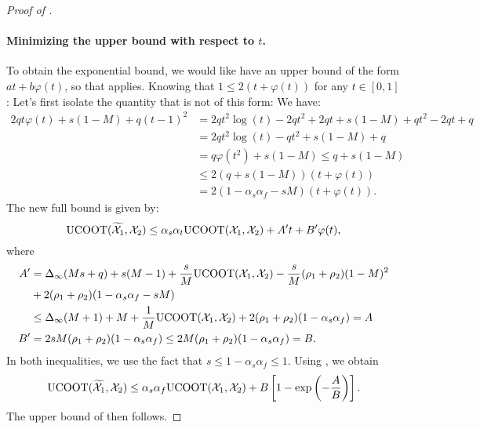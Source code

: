 \begin{proof}[Proof of ]
  \paragraph{Minimizing the upper bound with respect to $t$.}
  To obtain the exponential bound, we would like have an upper bound of the form
  $at + b\varphi(t)$, so that  applies.
  Knowing that $1 \leq 2(t + \varphi(t))$ for any $t \in [0, 1]$:
  Let's first isolate the quantity that is not of this form:
  We have:
  \begin{equation}
    \begin{split}
      2q t \varphi(t) + s(1 - M) + q(t-1)^2 &= 2qt^2\log(t) - 2qt^2 + 2qt + s(1-M) + qt^2 -2qt + q \\
      &=  2qt^2\log(t) - qt^2 + s(1-M) + q \\
      &= q\varphi(t^2) + s(1-M) \leq q + s(1-M) \\
      &\leq 2(q + s(1-M)) (t + \varphi(t)) \\
      &= 2(1 -\alpha_s\alpha_f - sM) (t + \varphi(t)).
    \end{split}
  \end{equation}
  The new full bound is given by:
  \begin{equation}
      \text{UCOOT}(\widetilde{\mathcal X_1}, \mathcal X_2) \leq \alpha_s\alpha_t \text{UCOOT}(\mathcal X_1, \mathcal X_2) + A' t + B'\varphi(t),
  \end{equation}
  where
  \begin{equation}
      \begin{split}
          A' &= \Delta_{\infty}(Ms + q) + s(M-1) + \frac{s}{M}\text{UCOOT}(\mathcal X_1, \mathcal X_2) - \frac{s}{M}(\rho_1 + \rho_2)(1-M)^2 \\
          &+ 2(\rho_1 + \rho_2) (1-\alpha_s\alpha_f - sM) \\
          & \leq \Delta_{\infty}(M + 1) + M + \frac{1}{M}\text{UCOOT}(\mathcal X_1, \mathcal X_2) + 2(\rho_1 + \rho_2) (1-\alpha_s\alpha_f) = A \\
          B' &= 2sM(\rho_1 + \rho_2) (1-\alpha_s\alpha_f) \leq 2M(\rho_1 + \rho_2) (1-\alpha_s\alpha_f) = B.
      \end{split}
  \end{equation}
  In both inequalities, we use the fact that $s \leq 1 - \alpha_s \alpha_f \leq 1$.
  Using , we obtain
  \begin{equation}
      \text{UCOOT}(\widetilde{\mathcal X_1}, \mathcal X_2)
      \leq \alpha_s\alpha_f \text{UCOOT}(\mathcal X_1, \mathcal X_2) + B \left[ 1 - \exp{ \left(- \frac{A}{B} \right) }\right].
  \end{equation}
  The upper bound of  then follows.
\end{proof}

